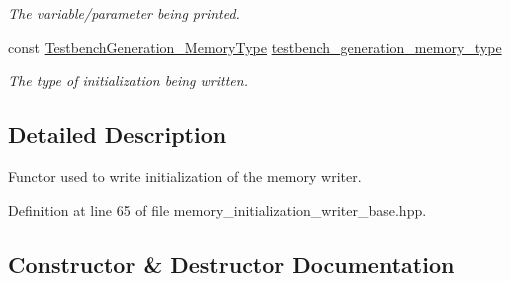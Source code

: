 \begin{DoxyCompactItemize}
\begin{DoxyCompactList}\small\item\em The variable/parameter being printed. \end{DoxyCompactList}\item 
const \hyperlink{testbench__generation_8hpp_ad84688161fffbe7da2fc2b9a39b93198}{Testbench\+Generation\+\_\+\+Memory\+Type} \hyperlink{classMemoryInitializationWriterBase_ac4f718dfd59eddbc0adf75e98b227ccb}{testbench\+\_\+generation\+\_\+memory\+\_\+type}
\begin{DoxyCompactList}\small\item\em The type of initialization being written. \end{DoxyCompactList}\end{DoxyCompactItemize}


\subsection{Detailed Description}
Functor used to write initialization of the memory writer. 

Definition at line 65 of file memory\+\_\+initialization\+\_\+writer\+\_\+base.\+hpp.



\subsection{Constructor \& Destructor Documentation}
\mbox{\label{classMemoryInitializationWriterBase_aecfe363b2187038fe689abceacb2343a}} 

